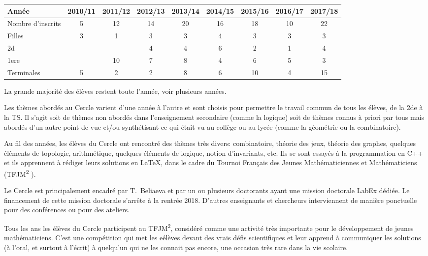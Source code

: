 \documentclass[11pt,notitlepage]{article}
\begin{document}
\medskip

\begin{tabular}{|l|c|c|c|c|c|c|c|c|}
	\hline
	Ann\'ee & 2010/11&2011/12&2012/13&2013/14&2014/15&2015/16& 2016/17&2017/18\\
	\hline
	Nombre d'inscrits&5 &12 &14 & 20&16 & 18&10 &22 \\
	\hline
	Filles& 3&1 &3 &3&4 &3 & 3&3 \\
	\hline
	2d& & &4 &4 &6 &2 &1 & 4\\
	\hline
	1ere& & 10&7 & 8&4 &6 &5 &3 \\
	\hline
	Terminales&5 &2 &2 &8 &6 &10 &4 &15 \\
	\hline
\end{tabular}

\medskip

La grande majorit\'e des \'el\`eves restent toute l'ann\'ee, voir plusieurs ann\'ees.

 Les th\`emes abord\'es au Cercle varient d'une ann\'ee \`a l'autre et
sont choisis pour permettre
le travail commun de tous les \'el\`eves, de la 2de \`a la TS. Il s'agit soit de th\`emes non abord\'es dans l'enseignement secondaire (comme la logique) soit de th\`emes 
connus \`a priori par tous mais abord\'es d'un autre point de vue et/ou synth\'etisant ce qui \'etait vu au coll\`ege ou au lyc\'ee (comme la g\'eom\'etrie ou la combinatoire).

Au fil des ann\'ees, les \'el\`eves du Cercle ont rencontr\'e  des th\`emes tr\`es divers: combinatoire, th\'eorie des jeux, th\'eorie des graphes, quelques \'el\'ements de topologie, 
arithm\'etique, quelques \'el\'ements de logique, notion d'invariants, etc. Ils se sont essay\'es \`a la programmation en C++ et ils apprennent \`a r\'ediger  leurs solutions en \LaTeX, 
dans le cadre du Tournoi Fran\c cais des Jeunes Math\'ematiciennes et Math\'ematiciens (TFJM\textsuperscript{2} ).

Le Cercle est principalement encadr\'e par T.~Beliaeva et par un ou plusieurs doctorants ayant une mission doctorale LabEx d\'edi\'ee. 
Le financement de cette mission doctorale s'arr\^ete \`a la rentr\'ee 2018. D'autres enseignants et chercheurs interviennent de mani\`ere ponctuelle pour des conf\'erences ou pour des ateliers.

Tous les ans les \'el\`eves du Cercle  participent au TFJM\textsuperscript{2}, consid\'er\'e comme une activit\'e tr\`es importante pour le d\'eveloppement de jeunes math\'ematiciens. 
C'est une comp\'etition qui met les e\'el\`eves devant des vrais d\'efis scientifiques et leur  apprend \`a communiquer les solutions (\`a l'oral, et surtout \`a l'\'ecrit)
 \`a quelqu'un qui ne les connait pas encore, une occasion tr\`es rare dans la vie scolaire.
\end{document}
